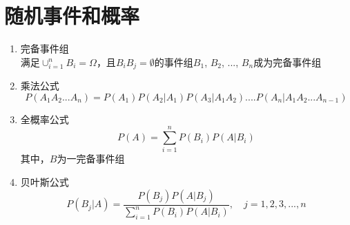 \section{随机事件和概率}

\begin{enumerate}
\item 完备事件组 \\
满足$\cup_{i=1}^nB_i=\Omega$，且$B_iB_j = \emptyset$的事件组$B_1$, $B_2$, ..., $B_n$成为完备事件组

\item 乘法公式
\begin{equation}
P(A_1A_2...A_n) = P(A_1)P(A_2|A_1)P(A_3|A_1A_2)....P(A_n|A_1A_2...A_{n-1})
\end{equation}

\item 全概率公式
\begin{equation}
P(A) = \sum_{i=1}^nP(B_i)P(A|B_i)
\end{equation}
其中，$B$为一完备事件组

\item 贝叶斯公式
\begin{equation}
P(B_j|A) = \frac{P(B_j)P(A|B_j)}{\sum_{i=1}^nP(B_i)P(A|B_i)},  \quad j = 1, 2, 3, ..., n
\end{equation}

\end{enumerate}
